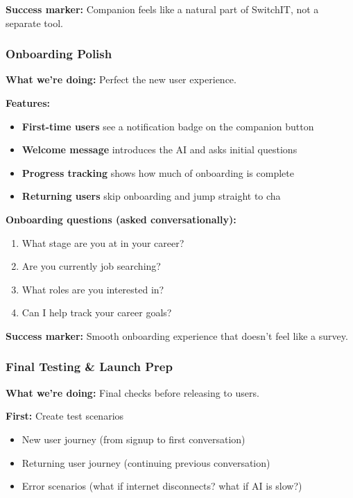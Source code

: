 \documentclass[12pt,a4paper]{article}
\begin{document}
\textbf{Success marker:} Companion feels like a natural part of SwitchIT, not a separate tool.

\subsubsection{Onboarding Polish}

\textbf{What we're doing:} Perfect the new user experience.

\textbf{Features:}
\begin{itemize}
  \item \textbf{First-time users} see a notification badge on the companion button
  \item \textbf{Welcome message} introduces the AI and asks initial questions
  \item \textbf{Progress tracking} shows how much of onboarding is complete
  \item \textbf{Returning users} skip onboarding and jump straight to cha
\end{itemize}

\textbf{Onboarding questions (asked conversationally):}
\begin{enumerate}
  \item What stage are you at in your career?
  \item Are you currently job searching?
  \item What roles are you interested in?
  \item Can I help track your career goals?
\end{enumerate}

\textbf{Success marker:} Smooth onboarding experience that doesn't feel like a survey.

\subsubsection{Final Testing \& Launch Prep}

\textbf{What we're doing:} Final checks before releasing to users.

\textbf{First:} Create test scenarios
\begin{itemize}
  \item New user journey (from signup to first conversation)
  \item Returning user journey (continuing previous conversation)
  \item Error scenarios (what if internet disconnects? what if AI is slow?)
\end{itemize}
\end{document}
